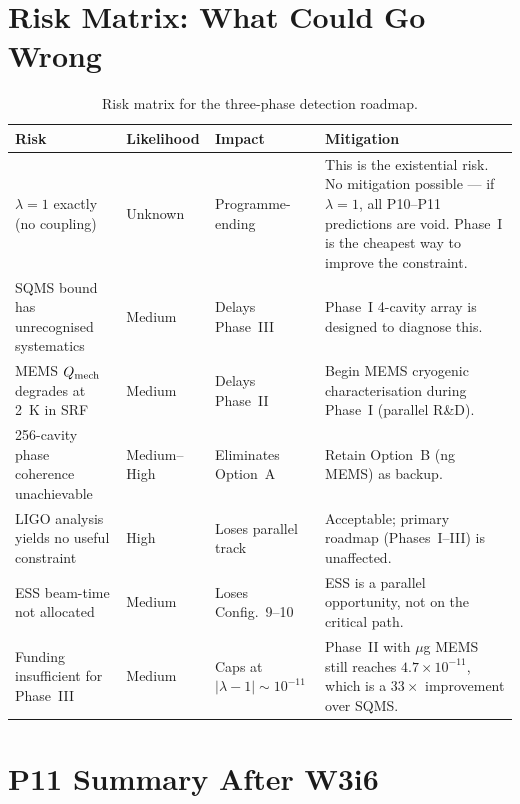 \documentclass[11pt]{article}
\theoremstyle{definition}
\theoremstyle{remark}
\newcommand{\ee}[1]{\times 10^{#1}}
\newcommand{\lam}{\lambda}
\newcommand{\lamdiff}{|\lambda-1|}
\begin{document}
\section{Risk Matrix: What Could Go Wrong}
\label{sec:risk_matrix}

\begin{table}[H]
\centering
\caption{Risk matrix for the three-phase detection roadmap.}
\begin{tabular}{@{}p{3cm}p{2cm}p{2cm}p{5.5cm}@{}}
\toprule
Risk & Likelihood & Impact & Mitigation \\
\midrule
$\lam = 1$ exactly (no coupling) & Unknown & Programme-ending &
  This is the existential risk. No mitigation possible --- if $\lam = 1$,
  all P10--P11 predictions are void. Phase~I is the cheapest way to
  improve the constraint. \\
\midrule
SQMS bound has unrecognised systematics & Medium & Delays Phase~III &
  Phase~I 4-cavity array is designed to diagnose this. \\
\midrule
MEMS $Q_{\rm mech}$ degrades at 2~K in SRF & Medium & Delays Phase~II &
  Begin MEMS cryogenic characterisation during Phase~I (parallel R\&D). \\
\midrule
256-cavity phase coherence unachievable & Medium--High & Eliminates
  Option~A & Retain Option~B (ng MEMS) as backup. \\
\midrule
LIGO analysis yields no useful constraint & High & Loses parallel
  track & Acceptable; primary roadmap (Phases~I--III) is unaffected. \\
\midrule
ESS beam-time not allocated & Medium & Loses Config.~9--10 &
  ESS is a parallel opportunity, not on the critical path. \\
\midrule
Funding insufficient for Phase~III & Medium & Caps at $\lamdiff \sim
  10^{-11}$ & Phase~II with $\mu$g MEMS still reaches $4.7\ee{-11}$,
  which is a $33\times$ improvement over SQMS. \\
\bottomrule
\end{tabular}
\label{tab:risk_matrix}
\end{table}

\section{P11 Summary After W3i6}
\label{sec:p11_summary}
\end{document}
